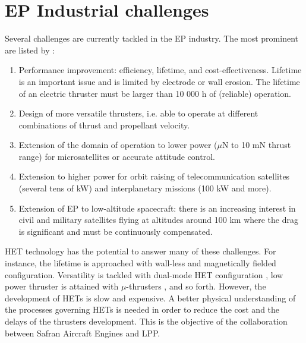 
\section*{EP Industrial challenges}
\label{sec-challenges}

Several challenges are currently tackled in the \ac{EP} industry.
The most prominent are listed by \citet{samukawa2012}\string:
\begin{enumerate}
  \item Performance improvement\string: efficiency, lifetime, and cost-effectiveness.
   Lifetime is an important issue and is limited by electrode or wall erosion.
   The lifetime of an electric thruster must be larger than 10 000 h of (reliable) operation.
   \item  Design of more versatile thrusters, i.e. able to operate at different combinations of thrust and propellant velocity.
   \item  Extension of the domain of operation to lower power ($\mu$N to 10 mN thrust range) for microsatellites or accurate attitude control.
   \item  Extension to higher power for orbit raising of telecommunication satellites (several tens of kW) and    interplanetary missions (100 kW and more).
   \item Extension of EP to low-altitude spacecraft\string: there is an increasing interest in civil and military satellites flying  at altitudes around 100 km where the drag is significant and must be continuously compensated.
\end{enumerate}

\ac{HET} technology has the potential to answer many of these challenges.
For instance, the lifetime is approached with wall-less and magnetically fielded configuration.
Versatility is tackled with dual-mode \ac{HET} configuration \citep{boniface2017}, low power thruster is attained with $\mu$-thrusters \citep{lascombes2018}, and so forth.
However, the development of \ac{HET}s is slow and expensive. 
A better physical understanding of the processes governing \ac{HET}s is needed in order to reduce the cost and the delays of the thrusters development.
This is the objective of the collaboration between Safran Aircraft Engines and \ac{LPP}.
